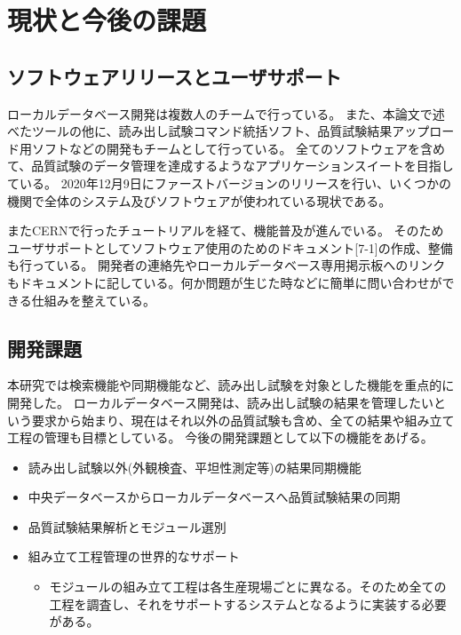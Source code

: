 \section{現状と今後の課題}
\subsection{ソフトウェアリリースとユーザサポート}
ローカルデータベース開発は複数人のチームで行っている。
また、本論文で述べたツールの他に、読み出し試験コマンド統括ソフト、品質試験結果アップロード用ソフトなどの開発もチームとして行っている。
全てのソフトウェアを含めて、品質試験のデータ管理を達成するようなアプリケーションスイートを目指している。
2020年12月9日にファーストバージョンのリリースを行い、いくつかの機関で全体のシステム及びソフトウェアが使われている現状である。

またCERNで行ったチュートリアルを経て、機能普及が進んでいる。
そのためユーザサポートとしてソフトウェア使用のためのドキュメント[7-1]の作成、整備も行っている。
開発者の連絡先やローカルデータベース専用掲示板へのリンクもドキュメントに記している。何か問題が生じた時などに簡単に問い合わせができる仕組みを整えている。

\subsection{開発課題}
本研究では検索機能や同期機能など、読み出し試験を対象とした機能を重点的に開発した。
ローカルデータベース開発は、読み出し試験の結果を管理したいという要求から始まり、現在はそれ以外の品質試験も含め、全ての結果や組み立て工程の管理も目標としている。
今後の開発課題として以下の機能をあげる。
\begin{itemize}
  \item 読み出し試験以外(外観検査、平坦性測定等)の結果同期機能
  \item 中央データベースからローカルデータベースへ品質試験結果の同期
  \item 品質試験結果解析とモジュール選別 
  \item 組み立て工程管理の世界的なサポート
  \begin{itemize}
    \item モジュールの組み立て工程は各生産現場ごとに異なる。そのため全ての工程を調査し、それをサポートするシステムとなるように実装する必要がある。
  \end{itemize}
\end{itemize}


